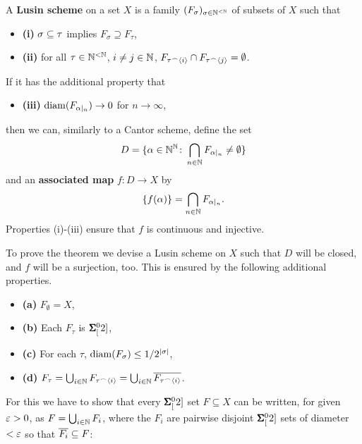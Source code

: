 \begin{definition}\label{def-lusin-scheme}A \textbf{Lusin scheme} on a set $X$ is a family $(F_\sigma)_{\sigma \in \mathbb{N}^{<\mathbb{N}}}$ of subsets of $X$ such that

\begin{itemize}
\item \textbf{(i)} $\sigma \subseteq \tau$ implies $F_\sigma \supseteq F_\tau$,
\item \textbf{(ii)} for all $\tau \in \mathbb{N}^{<\mathbb{N}}$, $i \neq j \in \mathbb{N}$, $F_{\tau\mbox{}^\frown \langle i \rangle} \cap F_{\tau\mbox{}^\frown \langle j \rangle} = \emptyset$.
\end{itemize}

If it has the additional property that

\begin{itemize}
\item \textbf{(iii)} $\mathrm{diam}(F_{\alpha \mid_{n}}) \to 0$  for $n \to \infty$,
\end{itemize}

then we can, similarly to a Cantor scheme, define the set
\begin{equation*}
D = \{\alpha \in \mathbb{N}^{\mathbb{N}} \colon \bigcap_{n \in \mathbb{N}} F_{\alpha\mid_{n}} \neq \emptyset \}
\end{equation*}
and an \textbf{associated map} $f: D \to X$ by
\begin{equation*}
\{f(\alpha)\} = \bigcap_{n \in \mathbb{N}} F_{\alpha\mid_{n}}.
\end{equation*}
Properties (i)-(iii) ensure that $f$ is continuous and injective.

\end{definition}To prove the theorem we devise a Lusin scheme on $X$ such that $D$ will be closed, and $f$ will be a surjection, too. This is ensured by the following additional properties.

\begin{itemize}
\item \textbf{(a)} $F_\emptyset = X$,
\item \textbf{(b)} Each $F_\tau$ is $\pmb{\Sigma}^0_{[}2]$,
\item \textbf{(c)} For each $\tau$, $\mathrm{diam}(F_\sigma) \leq 1/2^{|\sigma|}$,
\item \textbf{(d)} $F_\tau = \bigcup_{i \in \mathbb{N}} F_{\tau\mbox{}^\frown \langle i \rangle} =  \bigcup_{i \in \mathbb{N}} \overline{F_{\tau\mbox{}^\frown \langle i \rangle}}$.
\end{itemize}

For this we have to show that every $\pmb{\Sigma}^0_{[}2]$ set $F \subseteq X$ can be written, for given $\varepsilon > 0$, as  $F= \bigcup_{i \in \mathbb{N}} F_i$, where the $F_i$ are pairwise disjoint $\pmb{\Sigma}^0_{[}2]$ sets of diameter $< \varepsilon$ so that $\overline{F_i} \subseteq F$:

